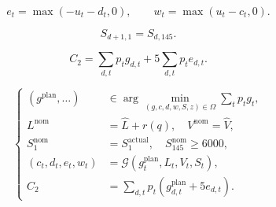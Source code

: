 \[
e_t=\max(-u_t-d_t,0),\qquad w_t=\max(u_t-c_t,0).
\]

\[
S_{d+1,1}=S_{d,145}.
\]

\[
C_2=\sum_{d,t}p_tg_{d,t}+5\sum_{d,t}p_te_{d,t}.
\]

\[
\boxed{\left\{\begin{aligned}(g^{\mathrm{plan}},\ldots)&\in\arg\min_{(g,c,d,w,S,z)\in\Omega}\sum_t p_tg_t,\\L^{\mathrm{nom}}&=\hat L+r(q),\quad V^{\mathrm{nom}}=\hat V,\\S_1^{\mathrm{nom}}&=S_1^{\mathrm{actual}},\quad S_{145}^{\mathrm{nom}}\geq6000,\\(c_t,d_t,e_t,w_t)&=\mathcal G(g_t^{\mathrm{plan}},L_t,V_t,S_t),\\C_2&=\sum_{d,t}p_t(g_{d,t}^{\mathrm{plan}}+5e_{d,t}).\end{aligned}\right.}
\]
